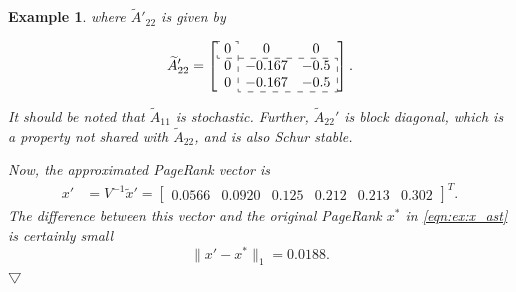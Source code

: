 \documentclass[11pt,draftcls,onecolumn]{IEEEtran}
\newtheorem{example}[theorem]{Example}
\newcommand{\norm}[1]{\lVert#1\rVert}
\newcommand{\End}{\hfill \mbox{$\bigtriangledown$}}
\begin{document}
\begin{example}
\vspace*{-2mm}
\noindent
where $\widetilde{A}'_{22}$ is given by

\vspace*{-2mm}
{\small
\begin{align*}
  \widetilde{A}'_{22}   
    = \left[\begin{array}{ccc}
        \cdashline{1-1}
        \multicolumn{1}{:c:}{0} &   0     &   0\\
        \cdashline{1-3}
        0 &  \multicolumn{1}{:c}{-0.167} &  \multicolumn{1}{c:}{-0.5}\\
        0 &  \multicolumn{1}{:c}{-0.167} &  \multicolumn{1}{c:}{-0.5}\\
        \cdashline{2-3}
      \end{array}\right].
\end{align*}}

\vspace*{-2mm}
\noindent
It should be noted that $\widetilde{A}_{11}$ is stochastic. Further, 
$\widetilde{A}_{22}'$ is block diagonal, which is a property
not shared with $\widetilde{A}_{22}$, and is also Schur stable.

Now, the approximated PageRank vector is
\begin{align*}
  x' &= V^{-1} \widetilde{x}'
      = \begin{bmatrix}
         0.0566 & 0.0920 & 0.125 & 0.212 & 0.213 & 0.302
       \end{bmatrix}^T.
\end{align*}
The difference between this vector and the original PageRank $x^*$ 
in \eqref{eqn:ex:x_ast} is certainly small 
\[
 \norm{x'-x^*}_1 
    = 0.0188.
\]
\End
\end{example}
\end{document}
